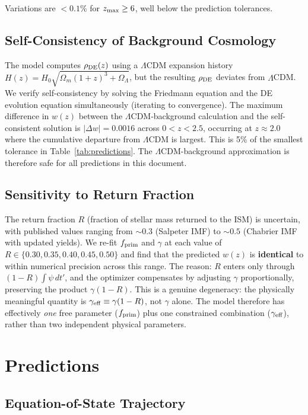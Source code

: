 \documentclass[12pt,preprint]{aastex631}
\begin{document}
Variations are $< 0.1\%$ for $z_{\rm max} \geq 6$, well below the prediction tolerances.

\subsection{Self-Consistency of Background Cosmology}

The model computes $\rho_{\rm DE}(z)$ using a $\Lambda$CDM expansion history $H(z) = H_0\sqrt{\Omega_m(1+z)^3 + \Omega_\Lambda}$, but the resulting $\rho_{\rm DE}$ deviates from $\Lambda$CDM. We verify self-consistency by solving the Friedmann equation and the DE evolution equation simultaneously (iterating to convergence). The maximum difference in $w(z)$ between the $\Lambda$CDM-background calculation and the self-consistent solution is $|\Delta w| = 0.0016$ across $0 < z < 2.5$, occurring at $z \approx 2.0$ where the cumulative departure from $\Lambda$CDM is largest. This is 5\% of the smallest tolerance in Table~\ref{tab:predictions}. The $\Lambda$CDM-background approximation is therefore safe for all predictions in this document.

\subsection{Sensitivity to Return Fraction}

The return fraction $R$ (fraction of stellar mass returned to the ISM) is uncertain, with published values ranging from $\sim 0.3$ (Salpeter IMF) to $\sim 0.5$ (Chabrier IMF with updated yields). We re-fit $f_{\rm prim}$ and $\gamma$ at each value of $R \in \{0.30, 0.35, 0.40, 0.45, 0.50\}$ and find that the predicted $w(z)$ is \textbf{identical} to within numerical precision across this range. The reason: $R$ enters only through $(1-R)\int\psi\,dt'$, and the optimizer compensates by adjusting $\gamma$ proportionally, preserving the product $\gamma(1-R)$. This is a genuine degeneracy: the physically meaningful quantity is $\gamma_{\rm eff} \equiv \gamma(1-R)$, not $\gamma$ alone. The model therefore has effectively \emph{one} free parameter ($f_{\rm prim}$) plus one constrained combination ($\gamma_{\rm eff}$), rather than two independent physical parameters.

\section{Predictions}

\subsection{Equation-of-State Trajectory}
\end{document}
